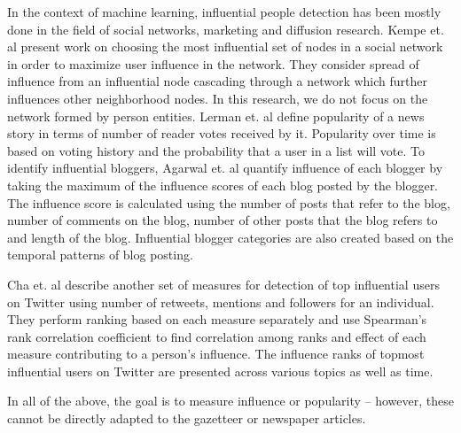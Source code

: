 In the context of machine learning, influential people detection has been mostly done in the field of social networks, marketing and diffusion research.
Kempe et. al \cite{kempe2003maximizing} present work on choosing the most influential set of nodes  in a social network in order to maximize user influence in the network. They consider spread of influence from an influential node cascading through a network which further influences other neighborhood nodes. In this research, we do not focus on the network formed by person entities. Lerman et. al \cite{lerman2010using} define popularity of a news story in terms of number of reader votes received by it. Popularity over time is based on voting history and the probability that a user in a list will vote. To identify influential bloggers, Agarwal et. al\cite{agarwal2008identifying} quantify influence of each blogger by taking the maximum of the influence scores of each blog posted by the blogger. The influence score is calculated using the number of posts that refer to the blog, number of comments on the blog, number of other posts that the blog refers to and length of the blog. Influential blogger categories are also created based on the temporal patterns of blog posting. 

Cha et. al\cite{cha2010measuring} describe another set of measures for detection of top influential users on Twitter using number of retweets, mentions and followers for an individual. They perform ranking based on each measure separately and use Spearman's rank correlation coefficient to find correlation among ranks and effect of each measure contributing to a person's influence. The influence ranks of topmost influential users on Twitter are presented across various topics as well as time.

In all of the above, the goal is to measure influence or popularity -- however, these cannot be directly adapted to the gazetteer or newspaper articles. 
